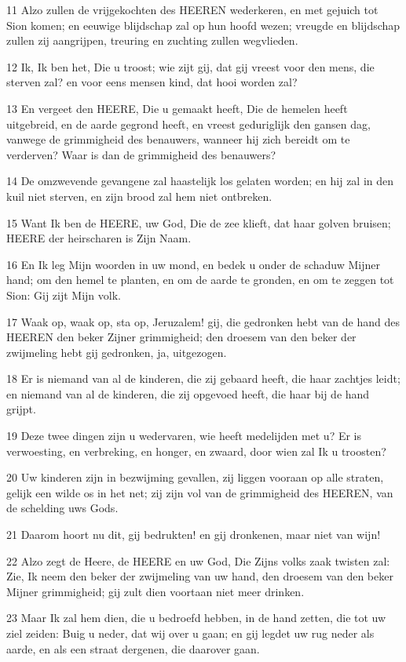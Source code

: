 \par 11 Alzo zullen de vrijgekochten des HEEREN wederkeren, en met gejuich tot Sion komen; en eeuwige blijdschap zal op hun hoofd wezen; vreugde en blijdschap zullen zij aangrijpen, treuring en zuchting zullen wegvlieden.
\par 12 Ik, Ik ben het, Die u troost; wie zijt gij, dat gij vreest voor den mens, die sterven zal? en voor eens mensen kind, dat hooi worden zal?
\par 13 En vergeet den HEERE, Die u gemaakt heeft, Die de hemelen heeft uitgebreid, en de aarde gegrond heeft, en vreest geduriglijk den gansen dag, vanwege de grimmigheid des benauwers, wanneer hij zich bereidt om te verderven? Waar is dan de grimmigheid des benauwers?
\par 14 De omzwevende gevangene zal haastelijk los gelaten worden; en hij zal in den kuil niet sterven, en zijn brood zal hem niet ontbreken.
\par 15 Want Ik ben de HEERE, uw God, Die de zee klieft, dat haar golven bruisen; HEERE der heirscharen is Zijn Naam.
\par 16 En Ik leg Mijn woorden in uw mond, en bedek u onder de schaduw Mijner hand; om den hemel te planten, en om de aarde te gronden, en om te zeggen tot Sion: Gij zijt Mijn volk.
\par 17 Waak op, waak op, sta op, Jeruzalem! gij, die gedronken hebt van de hand des HEEREN den beker Zijner grimmigheid; den droesem van den beker der zwijmeling hebt gij gedronken, ja, uitgezogen.
\par 18 Er is niemand van al de kinderen, die zij gebaard heeft, die haar zachtjes leidt; en niemand van al de kinderen, die zij opgevoed heeft, die haar bij de hand grijpt.
\par 19 Deze twee dingen zijn u wedervaren, wie heeft medelijden met u? Er is verwoesting, en verbreking, en honger, en zwaard, door wien zal Ik u troosten?
\par 20 Uw kinderen zijn in bezwijming gevallen, zij liggen vooraan op alle straten, gelijk een wilde os in het net; zij zijn vol van de grimmigheid des HEEREN, van de schelding uws Gods.
\par 21 Daarom hoort nu dit, gij bedrukten! en gij dronkenen, maar niet van wijn!
\par 22 Alzo zegt de Heere, de HEERE en uw God, Die Zijns volks zaak twisten zal: Zie, Ik neem den beker der zwijmeling van uw hand, den droesem van den beker Mijner grimmigheid; gij zult dien voortaan niet meer drinken.
\par 23 Maar Ik zal hem dien, die u bedroefd hebben, in de hand zetten, die tot uw ziel zeiden: Buig u neder, dat wij over u gaan; en gij legdet uw rug neder als aarde, en als een straat dergenen, die daarover gaan.

